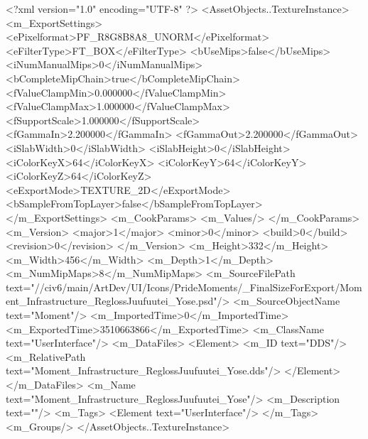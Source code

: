 <?xml version="1.0" encoding="UTF-8" ?>
<AssetObjects..TextureInstance>
	<m_ExportSettings>
		<ePixelformat>PF_R8G8B8A8_UNORM</ePixelformat>
		<eFilterType>FT_BOX</eFilterType>
		<bUseMips>false</bUseMips>
		<iNumManualMips>0</iNumManualMips>
		<bCompleteMipChain>true</bCompleteMipChain>
		<fValueClampMin>0.000000</fValueClampMin>
		<fValueClampMax>1.000000</fValueClampMax>
		<fSupportScale>1.000000</fSupportScale>
		<fGammaIn>2.200000</fGammaIn>
		<fGammaOut>2.200000</fGammaOut>
		<iSlabWidth>0</iSlabWidth>
		<iSlabHeight>0</iSlabHeight>
		<iColorKeyX>64</iColorKeyX>
		<iColorKeyY>64</iColorKeyY>
		<iColorKeyZ>64</iColorKeyZ>
		<eExportMode>TEXTURE_2D</eExportMode>
		<bSampleFromTopLayer>false</bSampleFromTopLayer>
	</m_ExportSettings>
	<m_CookParams>
		<m_Values/>
	</m_CookParams>
	<m_Version>
		<major>1</major>
		<minor>0</minor>
		<build>0</build>
		<revision>0</revision>
	</m_Version>
	<m_Height>332</m_Height>
	<m_Width>456</m_Width>
	<m_Depth>1</m_Depth>
	<m_NumMipMaps>8</m_NumMipMaps>
	<m_SourceFilePath text="//civ6/main/ArtDev/UI/Icons/PrideMoments/_FinalSizeForExport/Moment_Infrastructure_ReglossJuufuutei_Yose.psd"/>
	<m_SourceObjectName text="Moment"/>
	<m_ImportedTime>0</m_ImportedTime>
	<m_ExportedTime>3510663866</m_ExportedTime>
	<m_ClassName text="UserInterface"/>
	<m_DataFiles>
		<Element>
			<m_ID text="DDS"/>
			<m_RelativePath text="Moment_Infrastructure_ReglossJuufuutei_Yose.dds"/>
		</Element>
	</m_DataFiles>
	<m_Name text="Moment_Infrastructure_ReglossJuufuutei_Yose"/>
	<m_Description text=""/>
	<m_Tags>
		<Element text="UserInterface"/>
	</m_Tags>
	<m_Groups/>
</AssetObjects..TextureInstance>

